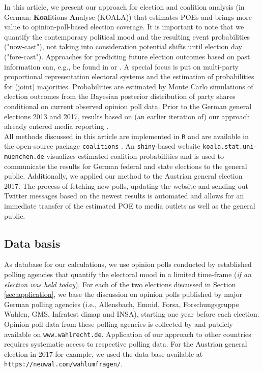 \documentclass[smallcondensed]{svjour3}     %
\begin{document}
In this article, we present our approach for election and coalition analysis
(in German: \textbf{Koal}itions-\textbf{A}nalyse (KOALA)) that estimates POEs 
and brings more value to opinion-poll-based election
coverage. It is important to note that we quantify the contemporary political mood
and the resulting event probabilities ("now-cast"), not taking into consideration
potential shifts until election day ("fore-cast"). Approaches for predicting
future election outcomes based on past information can, e.g., be found in
\citet{graefe_2017} or \citet{norpoth_gschwend_2010}. A special focus is put on
multi-party proportional representation electoral systems and the estimation 
of probabilities for (joint) majorities. Probabilities are estimated by Monte Carlo 
simulations of election outcomes from the Bayesian posterior distribution of party 
shares conditional on current observed opinion poll data. Prior to the German general 
elections 2013 and 2017, results based on (an earlier iteration of) our approach 
already entered media reporting \citep[cf.][]{wahlistik_2013, gelitz_2017}.\\

All methods discussed in this article are implemented in \texttt{R} \citep{r_2017}
and are available in the open-source package \texttt{coalitions} \citep{bender_bauer_2018}.
An \texttt{shiny}-based \citep{chang_2017} website
\texttt{koala.stat.uni-\allowbreak muenchen.\allowbreak de} visualizes estimated
coalition probabilities and is used to communicate the results for German federal
and state elections to the general public. Additionally, we applied our method
to the Austrian general election 2017. The process of fetching new polls,
updating the website and sending out Twitter messages based on the newest results
is automated and allows for an immediate transfer of the estimated POE 
to media outlets as well as the general public.

\subsection{Data basis}\label{ssec:data-basis}
As database for our calculations, we use opinion polls conducted by established
polling agencies that quantify the electoral mood in a limited time-frame
(\textit{if an election was held today}). For each of the two elections discussed
in Section \ref{sec:application}, we base the discussion on opinion polls published
by major German polling agencies (i.e., Allensbach, Emnid, Forsa, Forschungsgruppe Wahlen,
GMS, Infratest dimap and INSA), starting one year before each election.
Opinion poll data from these polling agencies is collected by and publicly available
on \texttt{www.wahlrecht.de}. Application of our approach to other countries
requires systematic access to respective polling data. For the Austrian general
election in 2017 for example, we used the data base available at
\texttt{https://neuwal.com/wahlumfragen/}.
\end{document}
